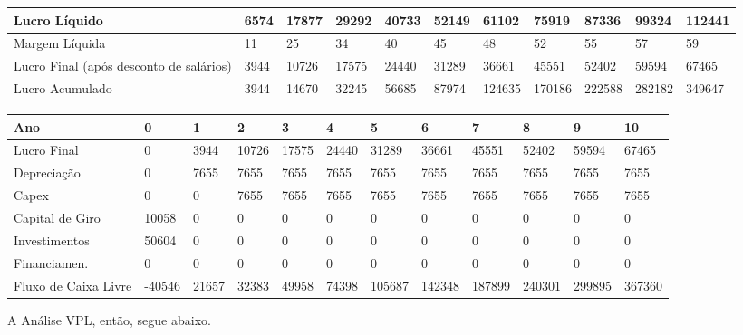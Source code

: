 \documentclass[a4paper, 12pt]{paper}
\begin{document}
\begin{landscape}
\begin{table}[ht]
\begin{tabular}{p{5cm}p{1.5cm}p{1.5cm}p{1.5cm}p{1.5cm}p{1.5cm}p{1.5cm}p{1.5cm}p{1.5cm}p{1.5cm}p{1.5cm}}
	Lucro Líquido & 6574 & 17877 & 29292 & 40733 & 52149 & 61102 & 75919 & 87336 & 99324 & 112441 \\ \hline
	Margem Líquida & 11 & 25 & 34 & 40 & 45 & 48 & 52 & 55 & 57 & 59 \\ \hline
	Lucro Final (após desconto de salários) & 3944 & 10726 & 17575 & 24440 & 31289 & 36661 & 45551 & 52402 & 59594 & 67465 \\ \hline
	Lucro Acumulado & 3944 & 14670 & 32245 & 56685 & 87974 & 124635 & 170186 & 222588 & 282182 & 349647 \\ \hline
		\end{tabular}
		\begin{tabular}{p{6.2cm}p{1.2cm}p{1.2cm}p{1.2cm}p{1.2cm}p{1.2cm}p{1.2cm}p{1.2cm}p{1.2cm}p{1.2cm}p{1.2cm}p{1.2cm}}
			\cellcolor{gray}Ano & \cellcolor{gray}0 & \cellcolor{gray}1 & \cellcolor{gray}2 & \cellcolor{gray}3 & \cellcolor{gray}4 & \cellcolor{gray}5 & \cellcolor{gray}6 & \cellcolor{gray}7 & \cellcolor{gray}8 &\cellcolor{gray} 9 & \cellcolor{gray}10 \\ \hline
			Lucro Final & 0 & 3944 & 10726 & 17575 & 24440 & 31289 & 36661 & 45551 & 52402 & 59594 & 67465 \\ \hline
			Depreciação & 0 & 7655 & 7655 & 7655 & 7655 & 7655 & 7655 & 7655 & 7655 & 7655 & 7655 \\ \hline
			Capex & 0 & 0 & 7655 & 7655 & 7655 & 7655 & 7655 & 7655 & 7655 & 7655 & 7655 \\ \hline
			Capital de Giro & 10058 & 0 & 0 & 0 & 0 & 0 & 0 & 0 & 0 & 0 & 0 \\ \hline
			Investimentos & 50604 & 0 & 0 & 0 & 0 & 0 & 0 & 0 & 0 & 0 & 0 \\ \hline
			Financiamen. & 0 & 0 & 0 & 0 & 0 & 0 & 0 & 0 & 0 & 0 & 0 \\ \hline
			Fluxo de Caixa Livre & -40546 & 21657 & 32383 & 49958 & 74398 & 105687 & 142348 & 187899 & 240301 & 299895 & 367360 \\ \hline
		\end{tabular}
	\end{table}


	\end{landscape}

A Análise VPL, então, segue abaixo.
\end{document}
